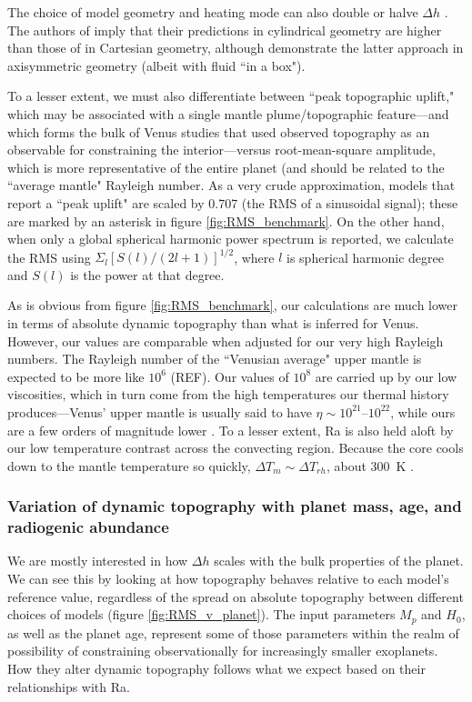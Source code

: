 The choice of model geometry and heating mode can also double or halve $\Delta h$ \citep[e.g.,][figure ]{Kiefer1992}. The authors of \citet{Kiefer1992} imply that their predictions in cylindrical geometry are higher than those of \citep{Parsons1983} in Cartesian geometry, although \citet{Nimmo1996} demonstrate the latter approach in axisymmetric geometry (albeit with fluid ``in a box"). 

To a lesser extent, we must also differentiate between ``peak topographic uplift," which may be associated with a single mantle plume/topographic feature---and which forms the bulk of Venus studies that used observed topography as an observable for constraining the interior---versus root-mean-square amplitude, which is more representative of the entire planet (and should be related to the ``average mantle" Rayleigh number. As a very crude approximation, models that report a ``peak uplift" are scaled by 0.707 (the RMS of a sinusoidal signal); these are marked by an asterisk in figure \ref{fig:RMS_benchmark}. On the other hand, when only a global spherical harmonic power spectrum is reported, we calculate the RMS using $\Sigma_l [S(l)/(2l + 1)]^{1/2}$, where $l$ is spherical harmonic degree and $S(l)$ is the power at that degree.

As is obvious from figure \ref{fig:RMS_benchmark}, our calculations are much lower in terms of absolute dynamic topography than what is inferred for Venus. However, our values are comparable when adjusted for our very high Rayleigh numbers. The Rayleigh number of the ``Venusian average" upper mantle is expected to be more like $10^6$ (REF). Our values of $10^8$ are carried up by our low viscosities, which in turn come from the high temperatures our thermal history produces---Venus' upper mantle is usually said to have $\eta\sim 10^{21}$--$10^{22}$, while ours are a few orders of magnitude lower \citep{Benesova2012}. To a lesser extent, Ra is also held aloft by our low temperature contrast across the convecting region. Because the core cools down to the mantle temperature so quickly, $\Delta T_m \sim \Delta T_{rh}$, about 300~K \citet[cf. 1000 K assumed by]{Kiefer1992}.



\subsubsection{Variation of dynamic topography with planet mass, age, and radiogenic abundance}

We are mostly interested in how $\Delta h$ scales with the bulk properties of the planet. We can see this by looking at how topography behaves relative to each model's reference value, regardless of the spread on absolute topography between different choices of models (figure \ref{fig:RMS_v_planet}). The input parameters $M_p$ and $H_{0}$, as well as the planet age, represent some of those parameters within the realm of possibility of constraining observationally for increasingly smaller exoplanets. How they alter dynamic topography follows what we expect based on their relationships with Ra.

